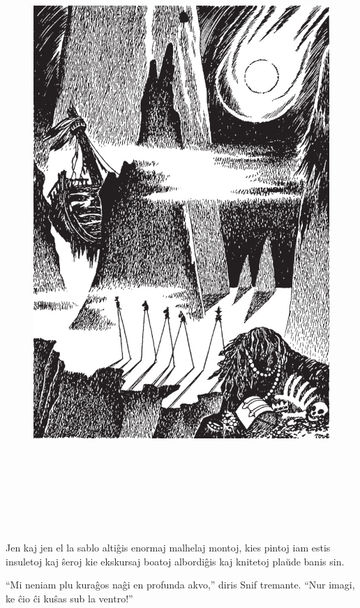 \begin{figure}[htbp]
\centering
\includegraphics[width=449pt,height=658pt]{7-4.png}
\caption{}
\label{7-4}
\end{figure}

Jen kaj jen el la sablo altiĝis enormaj malhelaj montoj, kies pintoj iam estis insuletoj kaj ŝeroj kie ekskursaj boatoj albordiĝis kaj knitetoj plaŭde banis sin.

``Mi neniam plu kuraĝos naĝi en profunda akvo,'' diris Snif tremante. ``Nur imagi, ke ĉio ĉi kuŝas sub la ventro!''

